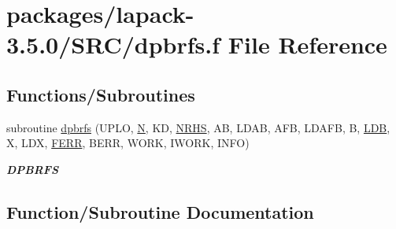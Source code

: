 \hypertarget{dpbrfs_8f}{}\section{packages/lapack-\/3.5.0/\+S\+R\+C/dpbrfs.f File Reference}
\label{dpbrfs_8f}
\subsection*{Functions/\+Subroutines}
\begin{DoxyCompactItemize}
\item 
subroutine \hyperlink{dpbrfs_8f_a4a050a20892fcd78791dd035a9f57bcf}{dpbrfs} (U\+P\+L\+O, \hyperlink{polmisc_8c_a0240ac851181b84ac374872dc5434ee4}{N}, K\+D, \hyperlink{example__user_8c_aa0138da002ce2a90360df2f521eb3198}{N\+R\+H\+S}, A\+B, L\+D\+A\+B, A\+F\+B, L\+D\+A\+F\+B, B, \hyperlink{example__user_8c_a50e90a7104df172b5a89a06c47fcca04}{L\+D\+B}, X, L\+D\+X, \hyperlink{superlu__enum__consts_8h_af00a42ecad444bbda75cde1b64bd7e72a78fd14d7abebae04095cfbe02928f153}{F\+E\+R\+R}, B\+E\+R\+R, W\+O\+R\+K, I\+W\+O\+R\+K, I\+N\+F\+O)
\begin{DoxyCompactList}\small\item\em {\bfseries D\+P\+B\+R\+F\+S} \end{DoxyCompactList}\end{DoxyCompactItemize}


\subsection{Function/\+Subroutine Documentation}
\hypertarget{dpbrfs_8f_a4a050a20892fcd78791dd035a9f57bcf}{}
